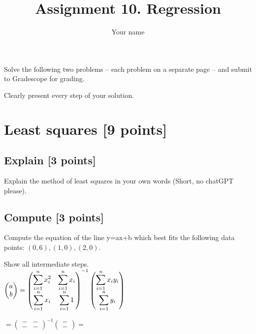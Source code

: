 \documentclass{article}
\title{Assignment 10. Regression}
\author{Your name}
\begin{document}
\maketitle

Solve the following two problems -- each problem on a separate page -- and submit to Gradescope for grading. 

Clearly present every step of your solution.

\newpage
\section{Least squares [9 points]}
\subsection{Explain [3 points]}
Explain the method of least squares in your own words (Short, no chatGPT please).\\


\subsection{Compute [3 points]}
Compute the equation of the line y=ax+b which best fits the following data points:
${(0,6), (1,0),(2,0)}$.

\noindent Show all intermediate steps.\\

 $\begin{pmatrix}a \\ b\end{pmatrix}
 =\begin{pmatrix}
   \smashoperator[r]{\sum_{i=1}^{n}} x_i^2 & 
        \smashoperator[r]{\sum_{i=1}^{n}} x_i\\ 
  \smashoperator[r]{\sum_{i=1}^{n}} x_i & 
       \smashoperator[r]{\sum_{i=1}^{n}} 1
   \end{pmatrix}^{-1}
   \begin{pmatrix}
   \smashoperator[r]{\sum_{i=1}^{n}} x_iy_i\\ 
  \smashoperator[r]{\sum_{i=1}^{n}} y_i 
   \end{pmatrix}$

   $
 =\begin{pmatrix}
   - &  -\\ 
   - &  -
   \end{pmatrix}^{-1}
   \begin{pmatrix}
  -\\ 
  -
   \end{pmatrix} = $\\
\end{document}
